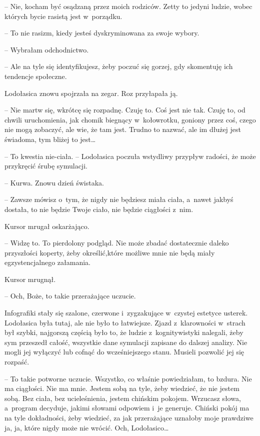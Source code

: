 \documentclass[oneside,polish,11pt,sfheadings]{mwbk}
\begin{document}
-- Nie, kocham być osądzaną przez moich rodziców. Zetty to jedyni ludzie,
wobec których bycie rasistą jest w~porządku.

-- To nie rasizm, kiedy jesteś dyskryminowana za swoje wybory.

-- Wybrałam odchodnictwo.

-- Ale na tyle się identyfikujesz, żeby poczuć się gorzej, gdy skomentuję
ich tendencje społeczne.

Lodołasica znowu spojrzała na zegar. Roz przyłapała ją.

-- Nie martw się, wkrótcę się rozpadnę. Czuję to. Coś jest nie tak. Czuję
to, od chwili uruchomienia, jak chomik biegnący w~kołowrotku, goniony
przez coś, czego nie mogą zobaczyć, ale wie, że tam jest. Trudno to
nazwać, ale im dłużej jest świadoma, tym bliżej to jest\ldots 

-- To kwestia nie-ciała. -- Lodołasica poczuła wstydliwy przypływ radości,
że może przykręcić śrubę symulacji.

-- Kurwa. Znowu dzień świstaka.

-- Zawsze mówisz o~tym, że nigdy nie będziesz miała ciała, a~nawet jakbyś
dostała, to nie będzie Twoje ciało, nie będzie ciągłości z~nim.

Kursor mrugał oskarżająco.

-- Widzę to. To pierdolony podgląd. Nie może zbadać dostatecznie daleko
przyszłości koperty, żeby określić,które możliwe mnie nie będą miały
egzystencjalnego załamania.

Kursor mrugnął.

-- Och, Boże, to takie przerażające uczucie.

Infografiki stały się szalone, czerwone i~zygzakujące w~czystej estetyce
usterek. Lodołasica była tutaj, ale nie było to łatwiejsze. Zjazd z~klarowności w~strach był szybki, najgorszą częścią było to, że ludzie z~kognitywistyki nalegali, żeby sym przeszedł całość, wszystkie dane
symulacji zapisane do dalszej analizy. Nie mogli jej wyłączyć lub cofnąć
do wcześniejszego stanu. Musieli pozwolić jej się rozpaść.

-- To takie potworne uczucie. Wszystko, co właśnie powiedziałam, to
bzdura. Nie ma ciągłości. Nie ma mnie. Jestem sobą na tyle, żeby
wiedzieć, że nie jestem sobą. Bez ciała, bez ucieleśnienia, jestem
chińskim pokojem. Wrzucasz słowa, a~program decyduje, jakimi słowami
odpowiem i~je generuje. Chiński pokój ma na tyle dokładności, żeby
wiedzieć, za jak przerażające uznałoby moje prawdziwe ja, ja, które
nigdy może nie wrócić. Och, Lodołasico\ldots 
\end{document}
